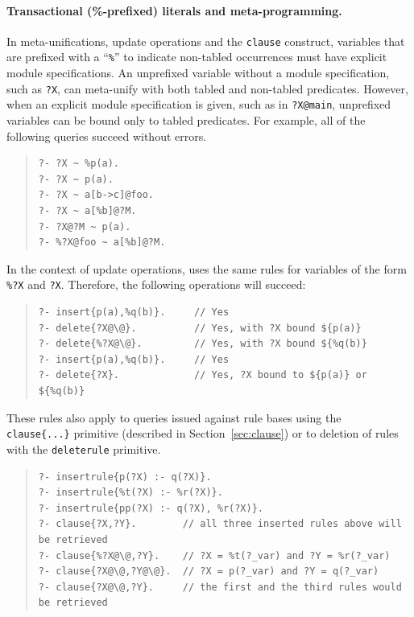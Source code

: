 \documentclass[11pt]{article}
\newcommand{\ERGO}{\mbox{\smaller{\ensuremath{\cal{E}}\smaller{{\sc{RGO}}}}}\xspace}
\newcommand{\FLSYSTEM}{\ERGO}
\begin{document}
\paragraph{Transactional (\%-prefixed) literals and meta-programming.}
In meta-unifications, update operations and the {\tt clause} construct,
variables that are prefixed with a ``{\tt \%}'' to indicate non-tabled
occurrences must have explicit module specifications. An unprefixed
variable without a module specification, such as {\tt ?X}, can meta-unify
with both tabled and non-tabled predicates.  However, when an explicit
module specification is given, such as in {\tt ?X@main}, unprefixed
variables can be bound only to tabled predicates. For example,
all of the following queries succeed without errors.

\begin{quote}
\begin{verbatim}
?- ?X ~ %p(a).      
?- ?X ~ p(a).         
?- ?X ~ a[b->c]@foo.  
?- ?X ~ a[%b]@?M.      
?- ?X@?M ~ p(a).     
?- %?X@foo ~ a[%b]@?M.
\end{verbatim}
\end{quote}

In the context of update operations, \FLSYSTEM uses the same rules for
variables of the form {\tt \%?X} and {\tt ?X}. Therefore, the
following operations will succeed:
\begin{quote}
\begin{verbatim}
?- insert{p(a),%q(b)}.     // Yes
?- delete{?X@\@}.          // Yes, with ?X bound ${p(a)}
?- delete{%?X@\@}.         // Yes, with ?X bound ${%q(b)}
?- insert{p(a),%q(b)}.     // Yes
?- delete{?X}.             // Yes, ?X bound to ${p(a)} or ${%q(b)}
\end{verbatim}
\end{quote}

These rules also apply to queries issued against rule bases using the {\tt
  clause\{...\}} primitive (described in Section~\ref{sec:clause}) or to deletion of rules with the {\tt deleterule} primitive.

\begin{quote}
\begin{verbatim}
?- insertrule{p(?X) :- q(?X)}.  
?- insertrule{%t(?X) :- %r(?X)}.
?- insertrule{pp(?X) :- q(?X), %r(?X)}.
?- clause{?X,?Y}.        // all three inserted rules above will be retrieved
?- clause{%?X@\@,?Y}.    // ?X = %t(?_var) and ?Y = %r(?_var)
?- clause{?X@\@,?Y@\@}.  // ?X = p(?_var) and ?Y = q(?_var)
?- clause{?X@\@,?Y}.     // the first and the third rules would be retrieved
\end{verbatim}
\end{quote}
\end{document}
